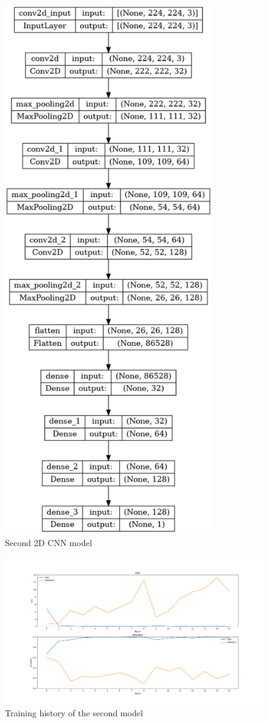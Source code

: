 \begin{figure}[]
    \centering
    \includegraphics[width=0.8\textwidth, height=1.3\textwidth]{images/2D_35_noDrop.png}
    \caption{Second 2D CNN model}
    \label{fig:Second2DCNN}
\end{figure}


\begin{figure}[]
    \centering
    \includegraphics[width=1\textwidth]{images/731a-2D35-86ad-history.png}
    \caption{Training history of the second model}
    \label{fig:Second2DCNNHistory}
\end{figure}


